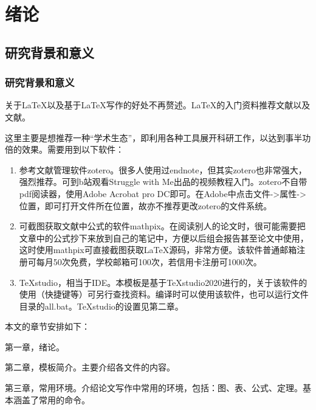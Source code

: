 \chapter{绪论}
%
\section{研究背景和意义}
\subsection{研究背景和意义}
%
关于\LaTeX{}以及基于\LaTeX{}写作的好处不再赘述。\LaTeX{}的入门资料推荐文献\parencite{_b}以及文献\parencite{_c}。

这里主要是想推荐一种“学术生态”，即利用各种工具展开科研工作，以达到事半功倍的效果。需要用到以下软件：
\begin{enumerate}
	\item 	参考文献管理软件zotero\cite{_f}。很多人使用过endnote，但其实zotero也非常强大，强烈推荐。可到b站观看Struggle with Me出品的视频教程\cite{_e}入门。zotero不自带pdf阅读器，使用Adobe Acrobat pro DC即可。在Adobe中点击文件->属性->位置，即可打开文件所在位置，故亦不推荐更改zotero的文件系统。
	\item	可截图获取文献中公式的软件mathpix\cite{_d}。在阅读别人的论文时，很可能需要把文章中的公式抄下来放到自己的笔记中，方便以后组会报告甚至论文中使用，这时使用mathpix可直接截图获取\LaTeX{}源码，非常方便。该软件普通邮箱注册可每月50次免费，学校邮箱可100次，若信用卡注册可1000次。	
	\item	TeXstudio，相当于IDE。本模板是基于TeXstudio2020进行的，关于该软件的使用（快捷键等）可另行查找资料。编译时可以使用该软件，也可以运行文件目录的all.bat。TeXstudio的设置见第二章。
\end{enumerate}

本文的章节安排如下：

第一章，绪论。

第二章，模板简介。主要介绍各文件的内容。

第三章，常用环境。介绍论文写作中常用的环境，包括：图、表、公式、定理。基本涵盖了常用的命令。



